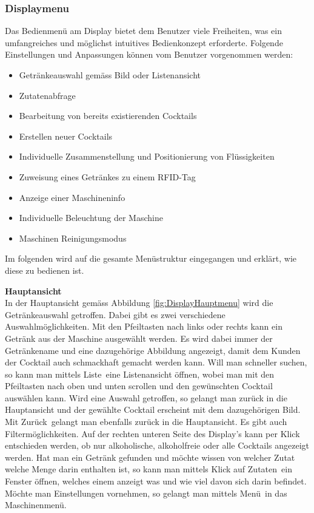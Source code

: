 \subsubsection{Displaymenu}
\label{subsubsec:Software_Displaymenu}

Das Bedienmenü am Display bietet dem Benutzer viele Freiheiten, was ein umfangreiches und möglichst intuitives Bedienkonzept erforderte. Folgende Einstellungen und Anpassungen können vom Benutzer vorgenommen werden:


\begin{itemize}
\item Getränkeauswahl gemäss Bild oder Listenansicht
\item Zutatenabfrage
\item Bearbeitung von bereits existierenden Cocktails
\item Erstellen neuer Cocktails 
\item Individuelle Zusammenstellung und Positionierung von Flüssigkeiten
\item Zuweisung eines Getränkes zu einem RFID-Tag
\item Anzeige einer Maschineninfo
\item Individuelle Beleuchtung der Maschine
\item Maschinen Reinigungsmodus
\end{itemize}

Im folgenden wird auf die gesamte Menüstruktur eingegangen und erklärt, wie diese zu bedienen ist.

\textbf{Hauptansicht}\\
In der Hauptansicht gemäss Abbildung \ref{fig:DisplayHauptmenu} wird die Getränkeauswahl getroffen. Dabei gibt es zwei verschiedene Auswahlmöglichkeiten. Mit den Pfeiltasten nach links oder rechts kann ein Getränk aus der Maschine ausgewählt werden. Es wird dabei immer der Getränkename und eine dazugehörige Abbildung angezeigt, damit dem Kunden der Cocktail auch schmackhaft gemacht werden kann. Will man schneller suchen, so kann man mittels \flqq Liste\frqq~eine Listenansicht öffnen, wobei man mit den Pfeiltasten nach oben und unten scrollen und den gewünschten Cocktail auswählen kann. Wird eine Auswahl getroffen, so gelangt man zurück in die Hauptansicht und der gewählte Cocktail erscheint mit dem dazugehörigen Bild. Mit \flqq Zurück\frqq~gelangt man ebenfalls zurück in die Hauptansicht. Es gibt auch Filtermöglichkeiten. Auf der rechten unteren Seite des Display's kann per Klick entschieden werden, ob nur alkoholische, alkoholfreie oder alle Cocktails angezeigt werden. Hat man ein Getränk gefunden und möchte wissen von welcher Zutat welche Menge darin enthalten ist, so kann man mittels Klick auf \flqq Zutaten\frqq~ein Fenster öffnen, welches einem anzeigt was und wie viel davon sich darin befindet. Möchte man Einstellungen vornehmen, so gelangt man mittels \flqq Menü\frqq~in das Maschinenmenü.

